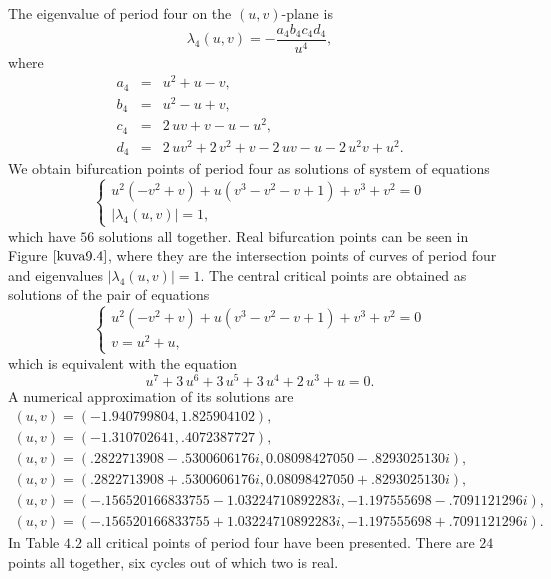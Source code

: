 \documentclass[12pt,a4paper]{amsart}
\numberwithin{equation}{section}
\numberwithin{lause}{section}
\begin{document}
The eigenvalue of period four on the $(u,v)$-plane is
\begin{displaymath}
\lambda_{4}(u,v)=-{\frac {a_{4}b_{4}c_{4}d_{4}}{{u}^{4}}},
\end{displaymath}
where
\begin{eqnarray*}
a_{4}&=&{u}^{2}+u-v ,\\
b_{4}&=&{u}^{2}-u+v,\\
c_{4}&=&2\,uv+v-u-{u}^{2},\\
d_{4}&=&2\,u{v}^{2}+2\,{v}^{2}+v-2\,
uv-u-2\,{u}^{2}v+{u}^{2}.
\end{eqnarray*}
We obtain bifurcation points of period four as solutions of system of equations
\begin{displaymath}
\left\{\begin{array}{l}
     u^{2}(-v^{2}+v)+u(v^{3}-v^{2}-v+1)+v^{3}+v^{2}=0 \\
      |\lambda_{4}(u,v)|=1,
\end{array}\right.
\end{displaymath}
which have $56$ solutions all together. Real bifurcation points can be seen in Figure $\ref{kuva9.4}$, where they are the intersection points of curves of period four and eigenvalues $|\lambda_{4}(u,v)|=1$. The central critical points are obtained as solutions of the pair of equations
\begin{displaymath}
\left\{\begin{array}{l}
     u^{2}(-v^{2}+v)+u(v^{3}-v^{2}-v+1)+v^{3}+v^{2}=0 \\
      v=u^{2}+u,
\end{array}\right.
\end{displaymath}
which is equivalent with the equation
\begin{displaymath}
{u}^{7}+3\,{u}^{6}+3\,{u}^{5}+3\,{u}^{4}+2\,{u}^{3}+u=0.
\end{displaymath}
A numerical approximation of its solutions are
 \begin{displaymath}
\begin{array}{l}
 (u,v)=(-1.940799804, 1.825904102), \\ (u,v)=(-1.310702641,.4072387727), \\  (u,v)=(.2822713908-.5300606176i, 0.08098427050-.8293025130i),\\ (u,v)=(.2822713908+.5300606176i, 0.08098427050+.8293025130i),\\ (u,v)=(-.156520166833755-1.03224710892283i, -1.197555698-.7091121296i),\\ (u,v)=(-.156520166833755+1.03224710892283i, -1.197555698+.7091121296i).
\end{array}
\end{displaymath}
In Table $4.2$ all critical points of period four have been presented. There are $24$ points all together, six cycles out of which two is real.
\end{document}

